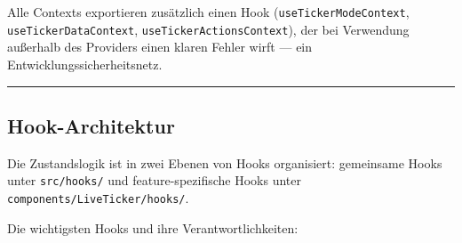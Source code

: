 Alle Contexts exportieren zusätzlich einen Hook
(\texttt{useTickerModeContext}, \texttt{useTickerDataContext},
\texttt{useTickerActionsContext}), der bei Verwendung außerhalb des
Providers einen klaren Fehler wirft --- ein Entwicklungssicherheitsnetz.

\begin{center}\rule{0.5\linewidth}{0.5pt}\end{center}

\subsection{Hook-Architektur}\label{hook-architektur}

Die Zustandslogik ist in zwei Ebenen von Hooks organisiert: gemeinsame
Hooks unter \texttt{src/hooks/} und feature-spezifische Hooks unter
\texttt{components/LiveTicker/hooks/}.

Die wichtigsten Hooks und ihre Verantwortlichkeiten:

